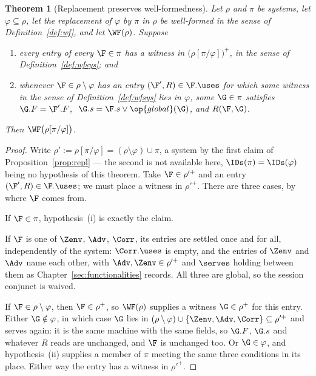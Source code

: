 \documentclass[10pt,oneside,openany]{book}
\theoremstyle{accentdef}
\theoremstyle{accentplain}
\newtheorem{theorem}[definition]{Theorem}
\begin{document}
\begin{theorem}[Replacement preserves well-formedness]\label{thm:wfrepl}
Let $\rho$ and $\pi$ be systems, let $\varphi \subseteq \rho$, let the replacement of $\varphi$
by $\pi$ in $\rho$ be well-formed
in the sense of Definition~\ref{def:wf}, and let $\WF(\rho)$. Suppose
\begin{enumerate}[label=(\roman*),leftmargin=2.2em]
  \item every entry of every $\F \in \pi$ has a witness in $\bigl(\rho[\pi/\varphi]\bigr)^{+}$,
        in the sense of Definition~\ref{def:wfsys}; and
  \item whenever $\F \in \rho \setminus \varphi$ has an entry $(\F',R) \in \F.\uses$ for which
        \emph{some} witness in the sense of Definition~\ref{def:wfsys} lies in $\varphi$, some
        $\G \in \pi$ satisfies
        $\G.F = \F'.F$, $\ \G.s = \F.s \vee \op{global}(\G)$, and $R(\F,\G)$.
\end{enumerate}
Then $\WF\bigl(\rho[\pi/\varphi]\bigr)$.
\end{theorem}

\begin{proof}
Write $\rho' := \rho[\pi/\varphi] = (\rho \setminus \varphi) \cup \pi$, a system by the first
claim of Proposition~\ref{prop:repl} --- the second is not available here, $\IDs(\pi) = \IDs(\varphi)$
being no hypothesis of this theorem. Take $\F \in \rho'^{+}$ and an entry $(\F',R) \in \F.\uses$; we must
place a witness in $\rho'^{+}$. There are three cases, by where $\F$ comes from.

If $\F \in \pi$, hypothesis~(i) is exactly the claim.

If $\F$ is one of $\Zenv$, $\Adv$, $\Corr$, its entries are settled once and for all,
independently of the system: $\Corr.\uses$ is empty, and the entries of $\Zenv$ and $\Adv$ name
each other, with $\Adv, \Zenv \in \rho'^{+}$ and $\serves$ holding between them as
Chapter~\ref{sec:functionalities} records. All three are global, so the session conjunct is waived.

If $\F \in \rho \setminus \varphi$, then $\F \in \rho^{+}$, so $\WF(\rho)$ supplies a witness
$\G \in \rho^{+}$ for this entry. Either $\G \notin \varphi$, in which case $\G$ lies in
$(\rho \setminus \varphi) \cup \{\Zenv,\Adv,\Corr\} \subseteq \rho'^{+}$ and serves again: it is
the same machine with the same fields, so $\G.F$, $\G.s$ and whatever $R$ reads are unchanged, and
$\F$ is unchanged too. Or $\G \in \varphi$, and hypothesis~(ii) supplies a member of $\pi$ meeting
the same three conditions in its place. Either way the entry has a witness in $\rho'^{+}$.
\end{proof}
\end{document}
